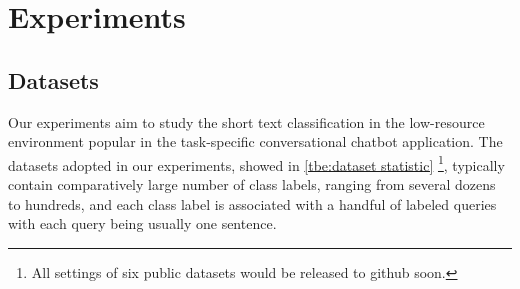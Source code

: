 \section{Experiments}
\label{sec:exp}

\subsection{Datasets}
Our experiments aim to study the short text classification in the low-resource environment  popular  in  the  task-specific conversational chatbot application.
The   datasets  adopted  in  our  experiments, showed in \ref{tbe:dataset statistic} \footnote{All settings of six public datasets would be released to github soon.}, typically  contain comparatively  large  number  of  class labels, ranging from several dozens to hundreds,  and  each  class  label  is  associated  with  a handful of labeled queries with each  query  being usually  one  sentence. 

